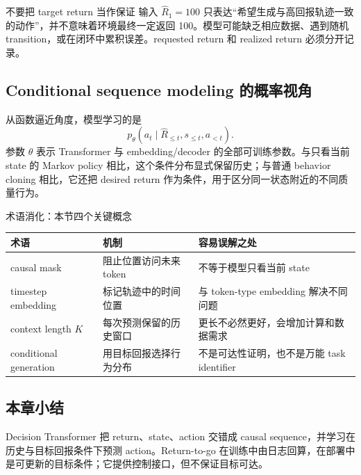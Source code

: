 \begin{warningbox}{不要把 target return 当作保证}
输入 $\widehat{R}_1=100$ 只表达“希望生成与高回报轨迹一致的动作”，并不意味着环境最终一定返回 100。模型可能缺乏相应数据、遇到随机 transition，或在闭环中累积误差。requested return 和 realized return 必须分开记录。
\end{warningbox}

\subsection{Conditional sequence modeling 的概率视角}

从函数逼近角度，模型学习的是
\[
p_{\theta}(a_t\mid \widehat{R}_{\le t},s_{\le t},a_{<t}).
\]
参数 $\theta$ 表示 Transformer 与 embedding/decoder 的全部可训练参数。与只看当前 state 的 Markov policy 相比，这个条件分布显式保留历史；与普通 behavior cloning 相比，它还把 desired return 作为条件，用于区分同一状态附近的不同质量行为。

\begin{knowledgebox}{术语消化：本节四个关键概念}
\begin{tabularx}{\textwidth}{L{3.0cm} X X}
\toprule
术语 & 机制 & 容易误解之处 \\
\midrule
causal mask & 阻止位置访问未来 token & 不等于模型只看当前 state \\
timestep embedding & 标记轨迹中的时间位置 & 与 token-type embedding 解决不同问题 \\
context length $K$ & 每次预测保留的历史窗口 & 更长不必然更好，会增加计算和数据需求 \\
conditional generation & 用目标回报选择行为分布 & 不是可达性证明，也不是万能 task identifier \\
\bottomrule
\end{tabularx}
\end{knowledgebox}

\subsection{本章小结}

Decision Transformer 把 return、state、action 交错成 causal sequence，并学习在历史与目标回报条件下预测 action。Return-to-go 在训练中由日志回算，在部署中是可更新的目标条件；它提供控制接口，但不保证目标可达。

